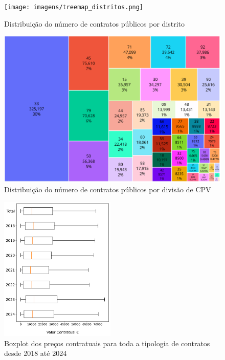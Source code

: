 \clearpage
\vfill
\begin{figure}[H]
	\centering
	\texttt{[image: imagens/treemap\_distritos.png]}
	\caption{Distribuição do número de contratos públicos por distrito}
	\label{fig:distritos}
\end{figure}
\vfill 
\begin{figure}[H]
	\centering
	\includegraphics[width=\textwidth]{imagens/treemap_contratos.png}
	\caption{Distribuição do número de contratos públicos por divisão de CPV}
	\label{fig:cpvs}
\end{figure}
\vfill
\clearpage


\begin{figure}
	\centering
	\includegraphics[width=0.49\textwidth]{imagens/precoscontr_stat.png}
	\caption{Boxplot dos preços contratuais para toda a tipologia de contratos desde 2018 até 2024}
	\label{fig:precotodos}
\end{figure}


